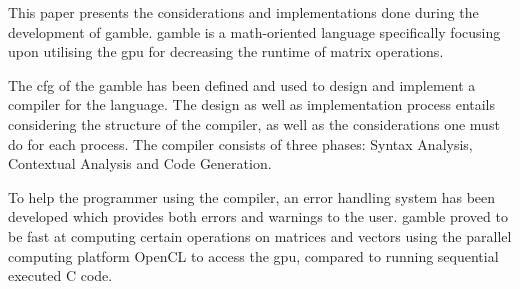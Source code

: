 This paper presents the considerations and implementations done during the development of \gls{gamble}.
\gls{gamble} is a math-oriented language specifically focusing upon utilising the \acrshort{gpu} for decreasing the runtime of matrix operations.

The \acrshort{cfg} of the \gls{gamble} has been defined and used to design and implement a compiler for the language.
The design as well as implementation process entails considering the structure of the compiler, as well as the considerations one must do for each process.
The compiler consists of three phases: Syntax Analysis, Contextual Analysis and Code Generation.

To help the programmer using the compiler, an error handling system has been developed which provides both errors and warnings to the user.
\gls{gamble} proved to be fast at computing certain operations on matrices and vectors using the parallel computing platform OpenCL to access the \acrshort{gpu}, compared to running sequential executed C code.
